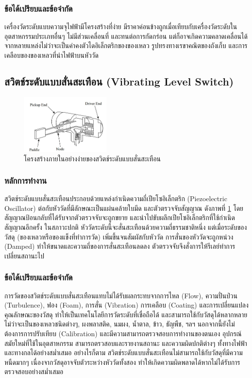\documentclass[final,11pt,a4paper]{article}
\begin{document}
\subsubsection{ข้อได้เปรียบและข้อจำกัด}
เครื่องวัดระดับแบบความจุไฟฟ้ามีโครงสร้างที่ง่าย มีราคาค่อนข้างถูกเมื่อเทียบกับเครื่องวัดระดับในอุตสาหกรรมประเภทอื่นๆ ไม่มีส่วนเคลื่อนที่ และทนต่อการกัดกร่อน
แต่ก็อาจเกิดความคลาดเคลื่อนได้จากหลายแหล่งไม่ว่าจะเป็นค่าคงตัวไดอิเล็กตริกของของเหลว รูปทรงทางเรขาคณิตของถังเก็บ และการเคลือบของของเหลวที่นำไฟฟ้าบนหัววัด
\subsection{สวิตช์ระดับแบบสั่นสะเทือน (Vibrating Level Switch)}
\begin{figure}[h]
    \centering
    \includegraphics[width=0.4\textwidth]{images/Screenshot_11.jpg}
    \caption{โครงสร้างภายในอย่างง่ายของสวิตช์ระดับแบบสั่นสะเทือน}
    \label{fig:vls}
\end{figure}
\subsubsection{หลักการทำงาน}
สวิตช์ระดับแบบสั่นสะเทือนประกอบด้วยแหล่งกำเนิดความถี่เปียโซอิเล็กตริก (Piezoelectric Oscillator) ต่อกับหัววัดที่มีลักษณะเป็นแผ่นคล้ายใบมีด 
และตัวตรวจจับสัญญาณ ดังภาพที่ \ref{fig:vls} โดยสัญญาณป้อนกลับที่ได้รับจากตัวตรวจจับจะถูกขยาย และนำไปขับผลึกเปียโซอิเล็กตริกที่ใช้กำเนิดสัญญาณอีกครั้ง
ในสภาวะปกติ หัววัดระดับนี้จะสั่นสะเทือนด้วยความถี่ธรรมชาติหนึ่ง แต่เมื่อระดับของวัสดุ (ของเหลวหรือของแข็งที่ทำการวัด) เพิ่มขึ้นจนสัมผัสกับหัววัด 
การสั่นของหัววัดจะถูกหน่วง (Damped) ทำให้ขนาดและความถี่ของการสั่นสะเทือนลดลง ตัวตรวจจับจึงสั่งการให้รีเลย์ทำการเปลี่ยนสถานะไป

\subsubsection{ข้อได้เปรียบและข้อจำกัด}
การวัดของสวิตช์ระดับแบบสั่นสะเทือนแทบไม่ได้รับผลกระทบจากการไหล (Flow), ความปั่นป่วน (Turbulence), ฟอง (Foam), การสั่น (Vibration)
การเคลือบ (Coating) และการเปลี่ยนแปลงคุณลักษณะของวัสดุ ทำให้เป็นเทคโนโลยีการวัดระดับที่เชื่อถือได้ และสามารถใช้กับวัสดุได้หลากหลาย ไม่ว่าจะเป็นของเหลวชนิดต่างๆ,
ผงพลาสติค, นมผง, น้ำตาล, ข้าว, ธัญพืช, ฯลฯ นอกจากนี้ยังไม่ต้องการการปรับเทียบ (Calibration) และมีความสามารถตรวจสอบการทำงานของตนเอง อุปกรณ์สมัยใหม่ที่ใช้ในอุตสาหกรรม 
สามารถตรวสอบและรายงานสถานะ และความผิดปกติต่างๆ ทั้งทางไฟฟ้าและทางกลได้อย่างสม่ำเสมอ อย่างไรก็ตาม 
สวิตช์ระดับแบบสั่นสะเทือนไม่สามารถใช้กับวัสดุที่มีความหนืดมากๆ เนื่องจากวัสดุอาจจับตัวระหว่างหัววัดทั้งสอง ทำให้เกิดความผิดพลาดได้หากไม่ได้รับการตรวจสอบอย่างสม่ำเสมอ 
\end{document}
